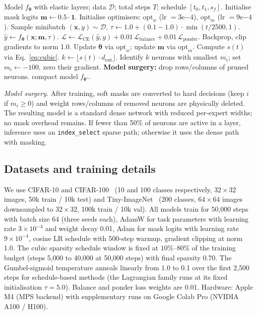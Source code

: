 \documentclass[fleqn,10pt]{article}
\newcommand{\bm}{\mathbf{m}}
\newcommand{\bx}{\mathbf{x}}
\newcommand{\btheta}{\boldsymbol{\theta}}
\begin{document}
\begin{algorithm}[t]
\caption{KaleidoNet training loop.}
\label{alg:training}
\begin{algorithmic}[1]
\REQUIRE Model $f_{\btheta}$ with elastic layers; data $\mathcal{D}$;
  total steps $T$; schedule $[t_0,t_1,s_f]$.
\STATE Initialise mask logits $\bm \leftarrow 0.5\cdot\mathbf{1}$.
\STATE Initialise optimisers: $\mathrm{opt}_w$ (lr $=3\mathrm{e}{-4}$),
  $\mathrm{opt}_m$ (lr $=9\mathrm{e}{-4}$).
  \STATE Sample minibatch $(\bx,y) \sim \mathcal{D}$.
  \STATE $\tau \leftarrow 1.0 + (0.1 - 1.0)\cdot\min(t/2500,1)$.
  \STATE $\hat y \leftarrow f_{\btheta}(\bx;\bm,\tau)$.
  \STATE
   $\mathcal{L} \leftarrow \mathcal{L}_{\mathrm{CE}}(\hat y, y)
    + 0.01\,\mathcal{L}_{\mathrm{balance}}
    + 0.01\,\mathcal{L}_{\mathrm{ponder}}$.
  \STATE Backprop, clip gradients to norm 1.0.
  \STATE Update $\btheta$ via $\mathrm{opt}_w$; update $\bm$ via
    $\mathrm{opt}_m$.
    \STATE Compute $s(t)$ via Eq.~\ref{eq:cubic}.
      \STATE $k \leftarrow \lfloor s(t)\cdot d_{\mathrm{out}}\rfloor$.
      \STATE Identify $k$ neurons with smallest $m_i$; set $m_i \leftarrow -100$,
        zero their gradient.
    \ENDFOR
  \ENDIF
\ENDFOR
\STATE \textbf{Model surgery:} drop rows/columns of pruned neurons.
\RETURN compact model $f_{\btheta'}$.
\end{algorithmic}
\end{algorithm}

\textit{Model surgery.} After training, soft masks are converted to
hard decisions (keep $i$ if $m_i\geq0$) and weight rows/columns of
removed neurons are physically deleted. The resulting model is a
standard dense network with reduced per-expert widths; no mask
overhead remains. If fewer than 50\% of neurons are active in a
layer, inference uses an \verb|index_select| sparse path; otherwise
it uses the dense path with masking.

\subsection*{Datasets and training details}

We use CIFAR-10 and CIFAR-100~\citep{krizhevsky2009learning} (10 and
100 classes respectively, $32{\times}32$ images, 50k train / 10k
test) and Tiny-ImageNet~\citep{le2015tiny} (200 classes,
$64{\times}64$ images downsampled to $32{\times}32$, 100k train / 10k
val). All models train for 50{,}000 steps with batch size 64 (three
seeds each), AdamW for task parameters with learning rate
$3\times10^{-4}$ and weight decay 0.01, Adam for mask logits with
learning rate $9\times10^{-4}$, cosine LR schedule with 500-step
warmup, gradient clipping at norm 1.0. The cubic sparsity schedule
window is fixed at $10\%$--$80\%$ of the training budget (steps
5{,}000 to 40{,}000 at 50{,}000 steps) with final sparsity 0.70. The
Gumbel-sigmoid temperature anneals linearly from 1.0 to 0.1 over the
first 2{,}500 steps for schedule-based methods (the Lagrangian family
runs at its fixed initialisation $\tau{=}5.0$). Balance
and ponder loss weights are 0.01. Hardware: Apple M4 (MPS backend)
with supplementary runs on Google Colab Pro (NVIDIA A100 / H100).
\end{document}
